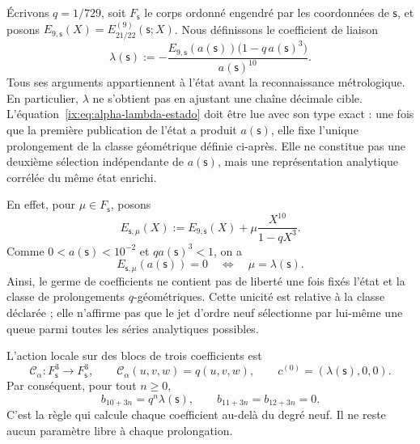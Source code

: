 Écrivons \(q=1/729\), soit \(F_{\mathsf s}\) le corps ordonné engendré par
les coordonnées de \(\mathsf s\), et posons
\(E_{9,\mathsf s}(X)=E_{21/22}^{(9)}(\mathsf s;X)\). Nous définissons le coefficient
de liaison
\begin{equation}
 \lambda(\mathsf s):=
 -\frac{E_{9,\mathsf s}(a(\mathsf s))
         \bigl(1-q\,a(\mathsf s)^3\bigr)}{a(\mathsf s)^{10}}.
 \label{ix:eq:alpha-lambda-estado}
\end{equation}
Tous ses arguments appartiennent à l'état avant la reconnaissance métrologique. En particulier, \(\lambda\) ne s'obtient pas en ajustant une chaîne décimale cible. L'équation~\eqref{ix:eq:alpha-lambda-estado} doit être lue avec son type exact : une fois que la première publication de l'état a produit \(a(\mathsf s)\), elle fixe l'unique prolongement de la classe géométrique définie ci-après. Elle ne constitue pas une deuxième sélection indépendante de \(a(\mathsf s)\), mais une représentation analytique corrélée du même état enrichi.

En effet, pour \(\mu\in F_{\mathsf s}\), posons
\[
 E_{\mathsf s,\mu}(X)
 :=E_{9,\mathsf s}(X)+\mu\frac{X^{10}}{1-qX^3}.
\]
Comme \(0<a(\mathsf s)<10^{-2}\) et \(qa(\mathsf s)^3<1\), on a
\begin{equation}
 E_{\mathsf s,\mu}(a(\mathsf s))=0
 \quad\Longleftrightarrow\quad
 \mu=\lambda(\mathsf s).
 \label{ix:eq:alpha-unicidad-lambda-clase-geometrica}
\end{equation}
Ainsi, le germe de coefficients ne contient pas de liberté une fois fixés l'état
et la classe de prolongements \(q\)-géométriques. Cette unicité est relative à la
classe déclarée ; elle n'affirme pas que le jet d'ordre neuf sélectionne par lui-même une
queue parmi toutes les séries analytiques possibles.

L'action locale sur des blocs de trois coefficients est
\begin{equation}
 \mathcal C_\alpha:F_{\mathsf s}^{3}\longrightarrow F_{\mathsf s}^{3},
 \qquad \mathcal C_\alpha(u,v,w)=q(u,v,w),
 \qquad c^{(0)}=(\lambda(\mathsf s),0,0).
 \label{ix:eq:alpha-accion-coeficientes}
\end{equation}
Par conséquent, pour tout \(n\geq0\),
\begin{equation}
 b_{10+3n}=q^n\lambda(\mathsf s),\qquad
 b_{11+3n}=b_{12+3n}=0.
 \label{ix:eq:alpha-recurrencia-coeficientes}
\end{equation}
C'est la règle qui calcule chaque coefficient au-delà du degré neuf. Il ne
reste aucun paramètre libre à chaque prolongation.

